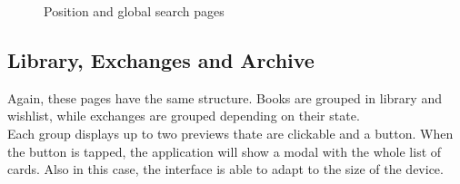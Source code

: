 \begin{figure}[H]
{      }
      \caption{Position and global search pages}
\end{figure}

\clearpage
\subsection{Library, Exchanges and Archive}
Again, these pages have the same structure. Books are grouped in library and wishlist, while exchanges are grouped depending on their state.\\
Each group displays up to two previews thate are clickable and a button.
When the button is tapped, the application will show a modal with the whole list of cards.
Also in this case, the interface is able to adapt to the size of the device.

